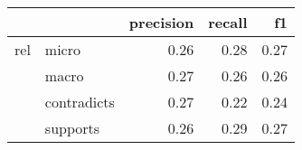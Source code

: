 \begin{tabular}{llrrr}
\toprule
    &          &  precision &  recall &   f1 \\
\midrule
rel & micro &       0.26 &    0.28 & 0.27 \\
    & macro &       0.27 &    0.26 & 0.26 \\
    & contradicts &       0.27 &    0.22 & 0.24 \\
    & supports &       0.26 &    0.29 & 0.27 \\
\bottomrule
\end{tabular}
